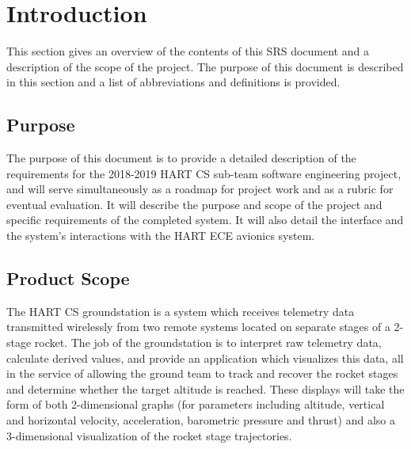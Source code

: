 \documentclass[onecolumn, draftclsnofoot,10pt, compsoc]{IEEEtran}
\begin{document}
	\newpage
	\tableofcontents
	\clearpage


	\section{Introduction}
		
		This section gives an overview of the contents of this SRS document and a description of the scope of the project.
		The purpose of this document is described in this section and a list of abbreviations and definitions is provided.
	
		\subsection{Purpose}
			The purpose of this document is to provide a detailed description of the requirements for the 2018-2019 HART CS sub-team software engineering project, and will serve simultaneously as a roadmap for project work and as a rubric for eventual evaluation. 
			It will describe the purpose and scope of the project and specific requirements of the completed system. 
			It will also detail the interface and the system's interactions with the HART ECE avionics system.

		\subsection{Product Scope}
			The HART CS groundstation is a system which receives telemetry data transmitted wirelessly from two remote systems located on separate stages of a 2-stage rocket. 
			The job of the groundstation is to interpret raw telemetry data, calculate derived values, and provide an application which visualizes this data, all in the service of allowing the ground team to track and recover the rocket stages and determine whether the target altitude is reached.
			These displays will take the form of both 2-dimensional graphs (for parameters including altitude, vertical and horizontal velocity, acceleration, barometric pressure and thrust) and also a 3-dimensional visualization of the rocket stage trajectories.
\end{document}
